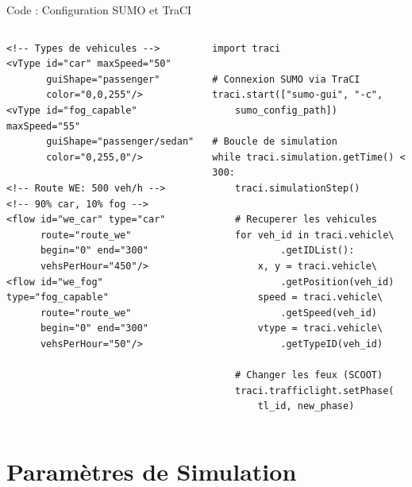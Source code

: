 \documentclass[10pt,aspectratio=169]{beamer}
\begin{document}
\begin{frame}[fragile]{Code : Configuration SUMO et TraCI}
\begin{columns}
\begin{lstlisting}[style=xml, title={routes\_low\_fog.rou.xml (10\% fog)}]
<!-- Types de vehicules -->
<vType id="car" maxSpeed="50" 
       guiShape="passenger" 
       color="0,0,255"/>
<vType id="fog_capable" maxSpeed="55" 
       guiShape="passenger/sedan" 
       color="0,255,0"/>

<!-- Route WE: 500 veh/h -->
<!-- 90% car, 10% fog -->
<flow id="we_car" type="car" 
      route="route_we" 
      begin="0" end="300" 
      vehsPerHour="450"/>
<flow id="we_fog" type="fog_capable" 
      route="route_we" 
      begin="0" end="300" 
      vehsPerHour="50"/>
\end{lstlisting}

\begin{lstlisting}[style=python, title={server.py -- TraCI (Python)}]
import traci

# Connexion SUMO via TraCI
traci.start(["sumo-gui", "-c", 
    sumo_config_path])

# Boucle de simulation
while traci.simulation.getTime() < 300:
    traci.simulationStep()
    
    # Recuperer les vehicules
    for veh_id in traci.vehicle\
            .getIDList():
        x, y = traci.vehicle\
            .getPosition(veh_id)
        speed = traci.vehicle\
            .getSpeed(veh_id)
        vtype = traci.vehicle\
            .getTypeID(veh_id)
        
    # Changer les feux (SCOOT)
    traci.trafficlight.setPhase(
        tl_id, new_phase)
\end{lstlisting}
\end{columns}
\end{frame}

\section{Param\`etres de Simulation}
\end{document}
